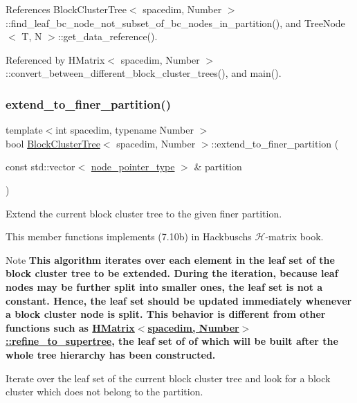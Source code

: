 References Block\+Cluster\+Tree$<$ spacedim, Number $>$\+::find\+\_\+leaf\+\_\+bc\+\_\+node\+\_\+not\+\_\+subset\+\_\+of\+\_\+bc\+\_\+nodes\+\_\+in\+\_\+partition(), and Tree\+Node$<$ T, N $>$\+::get\+\_\+data\+\_\+reference().



Referenced by H\+Matrix$<$ spacedim, Number $>$\+::convert\+\_\+between\+\_\+different\+\_\+block\+\_\+cluster\+\_\+trees(), and main().

\mbox{\label{classBlockClusterTree_adfe18d32a3c05a9209a5cdc9270b47d7}} 
\subsubsection{\texorpdfstring{extend\+\_\+to\+\_\+finer\+\_\+partition()}{extend\_to\_finer\_partition()}}
{\footnotesize\ttfamily template$<$int spacedim, typename Number $>$ \\
bool \hyperlink{classBlockClusterTree}{Block\+Cluster\+Tree}$<$ spacedim, Number $>$\+::extend\+\_\+to\+\_\+finer\+\_\+partition (\begin{DoxyParamCaption}\item[{const std\+::vector$<$ \hyperlink{classTreeNode}{node\+\_\+pointer\+\_\+type} $>$ \&}]{partition }\end{DoxyParamCaption})}

Extend the current block cluster tree to the given finer partition.

This member functions implements (7.\+10b) in Hackbusch\textquotesingle{}s $\mathcal{H}$-\/matrix book.


\begin{DoxyDescription}
\item[Note ]{\bfseries This algorithm iterates over each element in the leaf set of the block cluster tree to be extended. During the iteration, because leaf nodes may be further split into smaller ones, the leaf set is not a constant. Hence, the leaf set should be updated immediately whenever a block cluster node is split. This behavior is different from other functions such as {\ttfamily \hyperlink{classHMatrix_ad2b353962226c78910d6ddb6b5b8e460}{H\+Matrix$<$spacedim, Number$>$\+::refine\+\_\+to\+\_\+supertree}}, the leaf set of of which will be built after the whole tree hierarchy has been constructed.}  
\end{DoxyDescription}Iterate over the leaf set of the current block cluster tree and look for a block cluster which does not belong to the partition.

